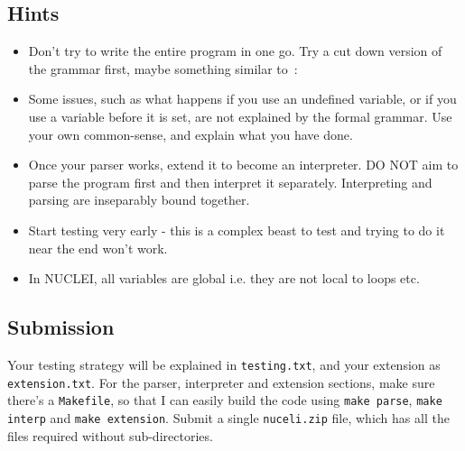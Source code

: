 \begin{exercise}
\subsection*{Hints}
\begin{itemize}
\item Don't try to write the entire program in one go. Try a cut
down version of the grammar first, maybe something similar to~:

\item Some issues, such as what happens if you use an undefined variable,
or if you use a variable before it is set, are not explained by the formal
grammar. Use your own common-sense, and explain what you have done.
\item Once your parser works, extend it to become an interpreter. DO NOT
aim to parse the program first and then interpret it separately. Interpreting
and parsing are inseparably bound together.
\item Start testing very early - this is a complex beast to test and trying to
do it near the end won't work.
\item In NUCLEI, all variables are global i.e. they are not local to loops etc.
\end{itemize}

\subsection*{Submission}
Your testing strategy will be explained in \verb^testing.txt^, and your extension
as \verb^extension.txt^. For the parser, interpreter and extension sections, make
sure there's a \verb^Makefile^, so that I can easily build the code using \verb^make parse^,
\verb^make interp^ and \verb^make extension^. Submit a single \verb^nuceli.zip^
file, which has all the files required without sub-directories.

\end{exercise}
